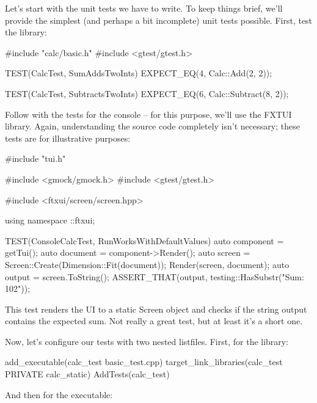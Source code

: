 Let’s start with the unit tests we have to write. To keep things brief, we’ll provide the simplest (and perhaps a bit incomplete) unit tests possible. First, test the library:


\begin{cmake}
#include "calc/basic.h"
#include <gtest/gtest.h>

TEST(CalcTest, SumAddsTwoInts) {
    EXPECT_EQ(4, Calc::Add(2, 2));
}

TEST(CalcTest, SubtractsTwoInts) {
    EXPECT_EQ(6, Calc::Subtract(8, 2));
}
\end{cmake}

Follow with the tests for the console – for this purpose, we’ll use the FXTUI library. Again, understanding the source code completely isn’t necessary; these tests are for illustrative purposes:


\begin{cmake}
#include "tui.h"

#include <gmock/gmock.h>
#include <gtest/gtest.h>

#include <ftxui/screen/screen.hpp>

using namespace ::ftxui;

TEST(ConsoleCalcTest, RunWorksWithDefaultValues) {
    auto component = getTui();
    auto document = component->Render();
    auto screen = Screen::Create(Dimension::Fit(document));
    Render(screen, document);
    auto output = screen.ToString();
    ASSERT_THAT(output, testing::HasSubstr("Sum: 102"));
}
\end{cmake}

This test renders the UI to a static Screen object and checks if the string output contains the expected sum. Not really a great test, but at least it’s a short one.

Now, let’s configure our tests with two nested listfiles. First, for the library:


\begin{cmake}
add_executable(calc_test basic_test.cpp)
target_link_libraries(calc_test PRIVATE calc_static)
AddTests(calc_test)
\end{cmake}

And then for the executable:


